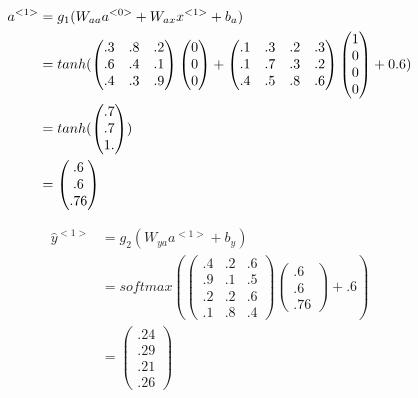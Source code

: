 \begin{equation*} 
    \begin{split}
    a^{<1>} & = g_{1}(W_{aa}a^{<0>} + W_{ax}x^{<1>} + b_{a}) \\
     & = tanh ( \space
        \begin{pmatrix} .3 & .8 & .2 \\  .6 & .4 & .1 \\ .4 & .3 & .9 \end{pmatrix}
        \begin{pmatrix}0\\0\\0\end{pmatrix} + 
        \begin{pmatrix}.1 & .3 & .2 & .3\\ .1 & .7 & .3 & .2\\.4 & .5 & .8 & .6\end{pmatrix} 
        \begin{pmatrix} 1 \\ 0 \\ 0 \\ 0 \end{pmatrix}
        + 0.6 \space  )\\
     & = tanh( \begin{pmatrix}  .7 \\ .7 \\ 1. \end{pmatrix} ) \\
     & = \begin{pmatrix} .6 \\ .6 \\ .76 \end{pmatrix}
    \end{split}
\end{equation*}

\begin{equation*} 
    \begin{split}
    \widehat{y}^{<1>} & = g_{2}(W_{ya}a^{<1>} + b_{y}) \\
     & = softmax( 
     \begin{pmatrix}.4 & .2 & .6\\ 
                    .9 & .1 & .5\\
                    .2 & .2 & .6\\
                    .1 & .8 & .4  \end{pmatrix}  
     \begin{pmatrix} .6 \\ .6 \\ .76 \end{pmatrix}
     + .6 )\\
     & = \begin{pmatrix} .24 \\ .29 \\ .21 \\ .26 \end{pmatrix}
    \end{split}
\end{equation*}

